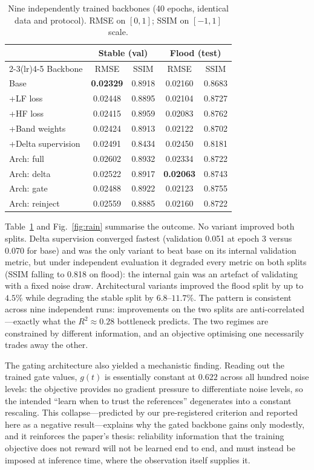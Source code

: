 \documentclass{article}
\begin{document}
\begin{table}[t]
\centering
\caption{Nine independently trained backbones (40 epochs, identical data and protocol). RMSE on $[0,1]$; SSIM on $[-1,1]$ scale.}
\label{tab:backbones}
\begin{tabular}{lcccc}
\toprule
 & \multicolumn{2}{c}{Stable (val)} & \multicolumn{2}{c}{Flood (test)} \\
\cmidrule(lr){2-3}\cmidrule(lr){4-5}
Backbone & RMSE & SSIM & RMSE & SSIM \\
\midrule
Base & \textbf{0.02329} & 0.8918 & 0.02160 & 0.8683 \\
+LF loss & 0.02448 & 0.8895 & 0.02104 & 0.8727 \\
+HF loss & 0.02415 & 0.8959 & 0.02083 & 0.8762 \\
+Band weights & 0.02424 & 0.8913 & 0.02122 & 0.8702 \\
+Delta supervision & 0.02491 & 0.8434 & 0.02450 & 0.8181 \\
Arch: full & 0.02602 & 0.8932 & 0.02334 & 0.8722 \\
Arch: delta & 0.02522 & 0.8917 & \textbf{0.02063} & 0.8743 \\
Arch: gate & 0.02488 & 0.8922 & 0.02123 & 0.8755 \\
Arch: reinject & 0.02559 & 0.8885 & 0.02160 & 0.8722 \\
\bottomrule
\end{tabular}
\end{table}

Table~\ref{tab:backbones} and Fig.~\ref{fig:rain} summarise the outcome. No variant improved both splits. Delta supervision converged fastest (validation 0.051 at epoch 3 versus 0.070 for base) and was the only variant to beat base on its internal validation metric, but under independent evaluation it degraded every metric on both splits (SSIM falling to 0.818 on flood): the internal gain was an artefact of validating with a fixed noise draw. Architectural variants improved the flood split by up to $4.5$\% while degrading the stable split by $6.8$--$11.7$\%. The pattern is consistent across nine independent runs: improvements on the two splits are anti-correlated---exactly what the $R^2\approx0.28$ bottleneck predicts. The two regimes are constrained by different information, and an objective optimising one necessarily trades away the other.

The gating architecture also yielded a mechanistic finding. Reading out the trained gate values, $g(t)$ is essentially constant at $0.622$ across all hundred noise levels: the objective provides no gradient pressure to differentiate noise levels, so the intended ``learn when to trust the references'' degenerates into a constant rescaling. This collapse---predicted by our pre-registered criterion and reported here as a negative result---explains why the gated backbone gains only modestly, and it reinforces the paper's thesis: reliability information that the training objective does not reward will not be learned end to end, and must instead be imposed at inference time, where the observation itself supplies it.
\end{document}
